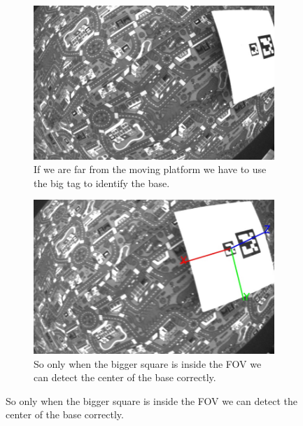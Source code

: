 \begin{figure}[!htbp]
  \centering
   \begin{subfigure}[b]{0.45\textwidth}
        \includegraphics[width=\textwidth]{img/frame0.jpg}
        \caption{If we are far from the moving platform we have to use the big tag to identify the base.}
        \label{fig:one}
   \end{subfigure}\hfill
   \begin{subfigure}[b]{0.45\textwidth}
        \includegraphics[width=\textwidth]{img/frame1.jpg}
        \caption{So only when the bigger square is inside the FOV we can detect the center of the base correctly.}
        \label{fig:two}
   \end{subfigure}
   

\end{figure}
